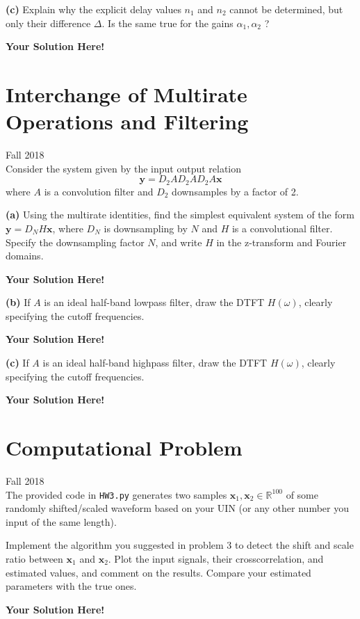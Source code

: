 \documentclass[12pt]{article}
\newcommand{\x}{\mathbf{x}}
\newcommand{\y}{\mathbf{y}}
\newcommand{\0}{\mathbf{0}}
\newcommand{\1}{\mathbf{1}}
\newcommand{\solspace}{\vspace{3mm} \textbf{Your Solution Here!} \vspace{3mm}}
\begin{document}
\textbf{(c)} Explain why the explicit delay values $n_1$ and $n_2$ cannot be determined, but only their difference $\Delta$. Is the same true for the gains $\alpha_1, \alpha_2$ ?

\solspace

\pagebreak
\section{Interchange of Multirate Operations and Filtering}
Fall 2018\\
Consider the system given by the input output relation
\begin{equation}
    \y = D_2 A D_2 A D_2 A \x
\end{equation}
where $A$ is a convolution filter and $D_2$ downsamples by a factor of 2.

\textbf{(a)} Using the multirate identities, find the simplest equivalent system of the form $\y = D_N H \x$, where $D_N$ is downsampling by $N$ and $H$ is a convolutional filter.
Specify the downsampling factor $N$, and write $H$ in the z-transform and Fourier domains.

\solspace

\textbf{(b)} If $A$ is an ideal half-band lowpass filter, draw the DTFT $H(\omega)$, clearly specifying the cutoff frequencies.

\solspace
\vspace{4cm}

\textbf{(c)} If $A$ is an ideal half-band highpass filter, draw the DTFT $H(\omega)$, clearly specifying the cutoff frequencies.

\solspace

\pagebreak

\section{Computational Problem}
Fall 2018\\
The provided code in \verb|HW3.py| generates two samples $\x_1, \x_2 \in \mathbb{R}^{100}$ of some randomly shifted/scaled waveform based on your UIN (or any other number you input of the same length).

Implement the algorithm you suggested in problem 3 to detect the shift and scale ratio between $\x_1$ and $\x_2$. Plot the input signals, their crosscorrelation, and estimated values, and comment on the results.
Compare your estimated parameters with the true ones.

\solspace
\end{document}
